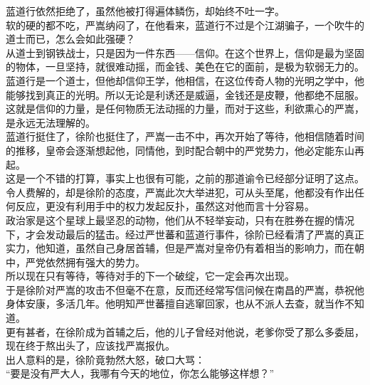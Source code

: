 \begin{multicols}{\theparacolNo}
蓝道行依然拒绝了，虽然他被打得遍体鳞伤，却始终不吐一字。\\

软的硬的都不吃，严嵩纳闷了，在他看来，蓝道行不过是个江湖骗子，一个吹牛的道士而已，怎么会如此强硬？\\

从道士到钢铁战士，只是因为一件东西——信仰。在这个世界上，信仰是最为坚固的物体，一旦坚持，就很难动摇，而金钱、美色在它的面前，是极为软弱无力的。\\

蓝道行是一个道士，但他却信仰王学，他相信，在这位传奇人物的光明之学中，他能够找到真正的光明。所以无论是利诱还是威逼，金钱还是皮鞭，他都绝不屈服。\\

这就是信仰的力量，是任何物质无法动摇的力量，而对于这些，利欲熏心的严嵩，是永远无法理解的。\\

蓝道行挺住了，徐阶也挺住了，严嵩一击不中，再次开始了等待，他相信随着时间的推移，皇帝会逐渐想起他，同情他，到时配合朝中的严党势力，他必定能东山再起。\\

这是一个不错的打算，事实上也很有可能，之前的那道谕令已经部分证明了这点。令人费解的，却是徐阶的态度，严嵩此次大举进犯，可从头至尾，他都没有作出任何反应，更没有利用手中的权力发起反扑，虽然这对他而言十分容易。\\

政治家是这个星球上最坚忍的动物，他们从不轻举妄动，只有在胜券在握的情况下，才会发动最后的猛击。经过严世蕃和蓝道行事件，徐阶已经看清了严嵩的真正实力，他知道，虽然自己身居首辅，但是严嵩对皇帝仍有着相当的影响力，而在朝中，严党依然拥有强大的势力。\\

所以现在只有等待，等待对手的下一个破绽，它一定会再次出现。\\

于是徐阶对严嵩的攻击不但毫不在意，反而还经常写信问候在南昌的严嵩，恭祝他身体安康，多活几年。他明知严世蕃擅自逃窜回家，也从不派人去查，就当作不知道。\\

更有甚者，在徐阶成为首辅之后，他的儿子曾经对他说，老爹你受了那么多委屈，现在终于熬出头了，应该找严嵩报仇。\\

出人意料的是，徐阶竟勃然大怒，破口大骂：\\

“要是没有严大人，我哪有今天的地位，你怎么能够这样想？”\\


\end{multicols}
